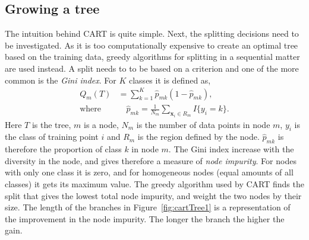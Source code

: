 \subsection{Growing a tree}
\label{sub:Growing a tree}
The intuition behind CART is quite simple. Next, the splitting decisions need to be investigated. As it is too computationally expensive to create an optimal tree based on the training data, greedy algorithms for splitting in a sequential matter are used instead. A split needs to to be based on a criterion and one of the more common is the \textit{Gini index}. For $K$ classes it is defined as,
\begin{align}
  Q_m(T) &= \sum^{K}_{k=1} \hat{p}_{mk} (1 - \hat{p}_{mk}),  \\ 
  \label{eq:pmk} 
  \text{where}& \quad \hat{p}_{mk} = \frac{1}{N_m} \sum_{\mathbf{x}_i \in R_m} I\{y_i = k\}.
\end{align}
Here $T$ is the tree, $m$ is a node, $N_m$ is the number of data points in node $m$, $y_i$ is the class of training point $i$ and $R_m$ is the region defined by the node.
$\hat{p}_{mk}$ is therefore the proportion of class $k$ in node $m$.
The Gini index increase with the diversity in the node, and gives therefore a measure of \textit{node impurity}. For nodes with only one class it is zero, and for homogeneous nodes (equal amounts of all classes) it gets its maximum value. The greedy algorithm used by CART finds the split that gives the lowest total node impurity, and weight the two nodes by their size.  
The length of the branches in Figure~\ref{fig:cartTree1} is a representation of the improvement in the node impurity. The longer the branch the higher the gain.

